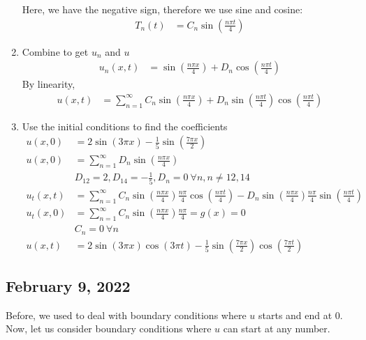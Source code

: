 \documentclass{article}
\begin{document}
\begin{enumerate}
  Here, we have the negative sign, therefore we use sine and cosine:
  \begin{align}
    T_n(t) & = C_n \sin \left( \frac{n \pi t}{4} \right)
  \end{align}
  \item Combine to get $u_n$ and $u$
  \begin{align}
    u_n(x, t) & = \sin\left(\frac{n \pi x}{4}\right) + D_n \cos \left( \frac{n \pi t}{4} \right)
  \end{align}
  By linearity,
  \begin{align}
    u(x, t) & = \sum^\infty_{n = 1} C_n \sin\left( \frac{n \pi x}{4} \right) + D_n \sin\left( \frac{n \pi t}{4} \right) \cos\left( \frac{n \pi t}{4} \right)
  \end{align}
  \item Use the initial conditions to find the coefficients
  \begin{align}
    u(x, 0) & = 2 \sin (3 \pi x) - \frac{1}{5} \sin \left( \frac{ 7 \pi x}{2} \right)\\
    u(x, 0) & = \sum^\infty_{n = 1} D_n \sin\left( \frac{n \pi x}{4} \right)\\
    & D_{12} = 2, D_{14} = -\frac{1}{5}, D_n = 0 \ \forall n, n \neq 12, 14\\
    u_t(x, t) & = \sum^\infty_{n = 1} C_n \sin\left( \frac{n \pi x}{4} \right) \frac{n \pi}{4} \cos\left( \frac{n \pi t}{4} \right) - D_n \sin\left( \frac{n \pi x}{4} \right) \frac{n \pi}{4} \sin\left( \frac{n \pi t}{4} \right)\\
    u_t(x, 0) & = \sum^\infty_{n = 1} C_n \sin\left( \frac{n \pi x}{4} \right) \frac{n \pi}{4} = g(x) = 0\\
    & C_n = 0 \ \forall n\\
    u(x, t) & = 2 \sin(3 \pi x) \cos(3 \pi t) - \frac{1}{5} \sin\left( \frac{7 \pi x}{2} \right) \cos\left( \frac{7 \pi t}{2} \right)
  \end{align}
\end{enumerate}

\newpage

\subsection*{February 9, 2022}

Before, we used to deal with boundary conditions where $u$ starts and end at $0$. Now, let us consider boundary conditions where $u$ can start at any number.
\end{document}
